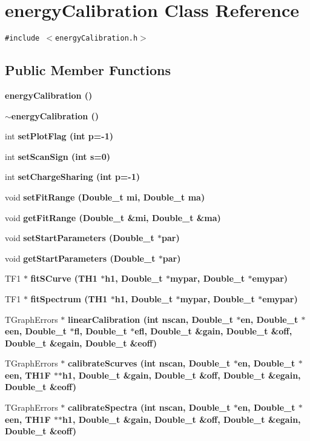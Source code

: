 \section{energy\-Calibration Class Reference}
\label{classenergyCalibration}
{\tt \#include $<$energy\-Calibration.h$>$}

\subsection*{Public Member Functions}
\begin{CompactItemize}
\item 
\bf{energy\-Calibration} ()
\item 
\bf{$\sim$energy\-Calibration} ()
\item 
int \bf{set\-Plot\-Flag} (int p=-1)
\item 
int \bf{set\-Scan\-Sign} (int s=0)
\item 
int \bf{set\-Charge\-Sharing} (int p=-1)
\item 
void \bf{set\-Fit\-Range} (Double\_\-t mi, Double\_\-t ma)
\item 
void \bf{get\-Fit\-Range} (Double\_\-t \&mi, Double\_\-t \&ma)
\item 
void \bf{set\-Start\-Parameters} (Double\_\-t $\ast$par)
\item 
void \bf{get\-Start\-Parameters} (Double\_\-t $\ast$par)
\item 
TF1 $\ast$ \bf{fit\-SCurve} (TH1 $\ast$h1, Double\_\-t $\ast$mypar, Double\_\-t $\ast$emypar)
\item 
TF1 $\ast$ \bf{fit\-Spectrum} (TH1 $\ast$h1, Double\_\-t $\ast$mypar, Double\_\-t $\ast$emypar)
\item 
TGraph\-Errors $\ast$ \bf{linear\-Calibration} (int nscan, Double\_\-t $\ast$en, Double\_\-t $\ast$een, Double\_\-t $\ast$fl, Double\_\-t $\ast$efl, Double\_\-t \&gain, Double\_\-t \&off, Double\_\-t \&egain, Double\_\-t \&eoff)
\item 
TGraph\-Errors $\ast$ \bf{calibrate\-Scurves} (int nscan, Double\_\-t $\ast$en, Double\_\-t $\ast$een, TH1F $\ast$$\ast$h1, Double\_\-t \&gain, Double\_\-t \&off, Double\_\-t \&egain, Double\_\-t \&eoff)
\item 
TGraph\-Errors $\ast$ \bf{calibrate\-Spectra} (int nscan, Double\_\-t $\ast$en, Double\_\-t $\ast$een, TH1F $\ast$$\ast$h1, Double\_\-t \&gain, Double\_\-t \&off, Double\_\-t \&egain, Double\_\-t \&eoff)
\end{CompactItemize}

